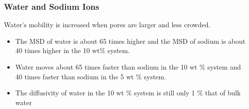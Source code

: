 \documentclass{article}
\begin{document}
  \subsubsection*{Water and Sodium Ions}\label{section:transport_water_sodium}

  \noindent Water's mobility is increased when pores are larger and less crowded.
  \begin{itemize}
    \item The MSD of water is about 65 times higher and the MSD of sodium is about 40
    times higher in the 10 wt\% system.
    \item Water moves about 65 times faster than sodium in the 10 wt \% system and
    40 times faster than sodium in the 5 wt \% system. %
    \item The diffusivity of water in the 10 wt \% system is still only 1 \% that of 
    bulk water %
  \end{itemize}
  
  
  
\end{document}
